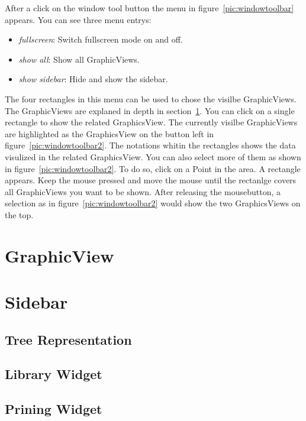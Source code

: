 \documentclass[a4paper,11pt]{report}
\begin{document}
\begin{minipage}[h]{\textwidth-7cm}
After a click on the window tool button the menu in figure~\ref{pic:windowtoolbar} appears. You can see three menu entrys:
\begin{itemize}
	\item \textit{fullscreen}: Switch fullscreen mode on and off.
	\item \textit{show all}: Show all GraphicViews.
	\item \textit{show sidebar}: Hide and show the sidebar.
\end{itemize}
The four rectangles in this menu can be used to chose the visilbe GraphicViews. The GraphicViews are explaned in depth in section~\ref{sec:graphical}. You can click on a single rectangle to show the related GraphicsView. The currently visilbe GraphicViews are highlighted as the GraphicsView on the button left in figure~\ref{pic:windowtoolbar2}. The notations whitin the rectangles shows the data visulized in the related GraphicsView. You can also select more of them as shown in figure~\ref{pic:windowtoolbar2}. To do so, click on a Point in the area. A rectangle appears. Keep the mouse pressed and move the mouse until the rectanlge covers all GraphicViews you want to be shown. After releasing the mousebutton, a selection as in figure~\ref{pic:windowtoolbar2} would show the two GraphicsViews on the top. 
\end{minipage}

\section{GraphicView}
\label{sec:graphical}

\section{Sidebar}
\label{sec:sidebar}

\subsection{Tree Representation}
\label{ssec:tree}

\subsection{Library Widget}
\label{ssec:library}

\subsection{Prining Widget}
\label{ssec:printingwidget}
\end{document}
